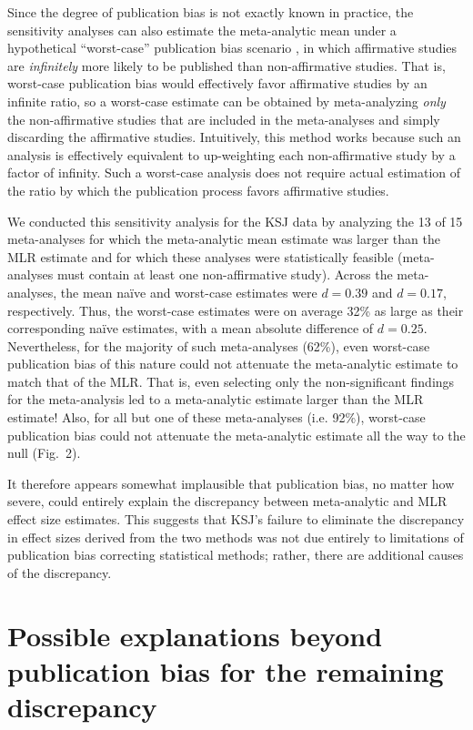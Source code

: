 \documentclass[man,floatsintext]{apa7}
\begin{document}
Since the degree of publication bias is not exactly known in practice, the sensitivity analyses can also estimate the meta-analytic mean under a hypothetical “worst-case” publication bias scenario \parencite{mathur2019sensitivity}, in which affirmative studies are \emph{infinitely} more likely to be published than non-affirmative studies.  That is, worst-case publication bias would effectively favor affirmative studies by an infinite ratio, so a worst-case estimate can be obtained by meta-analyzing \emph{only} the non-affirmative studies that are included in the meta-analyses and simply discarding the affirmative studies. Intuitively, this method works because such an analysis is effectively equivalent to up-weighting each non-affirmative study by a factor of infinity. Such a worst-case analysis does not require actual estimation of the ratio by which the publication process favors affirmative studies.
 

We conducted this sensitivity analysis for the KSJ data by analyzing the 13 of 15 meta-analyses for which the meta-analytic mean estimate was larger than the MLR estimate and for which these analyses were statistically feasible (meta-analyses must contain at least one non-affirmative study). Across the meta-analyses, the mean na{\"i}ve and worst-case estimates were $d=0.39$ and $d=0.17$, respectively. Thus, the worst-case estimates were on average 32\% as large as their corresponding na{\"i}ve estimates, with a mean absolute difference of $d=0.25$. Nevertheless, for the majority of such meta-analyses (62\%), even worst-case publication bias of this nature could not attenuate the meta-analytic estimate to match that of the MLR. That is, even selecting only the non-significant findings for the meta-analysis led to a meta-analytic estimate larger than the MLR estimate! Also, for all but one of these meta-analyses (i.e. 92\%), worst-case publication bias could not attenuate the meta-analytic estimate all the way to the null (Fig.\ 2).



It therefore appears somewhat implausible that publication bias, no matter how severe, could entirely explain the discrepancy between meta-analytic and MLR effect size estimates. This suggests that KSJ's failure to eliminate the discrepancy in effect sizes derived from the two methods was not due entirely to limitations of publication bias correcting statistical methods; rather, there are additional causes of the discrepancy.  

\section{Possible explanations beyond publication bias for the remaining discrepancy}
\end{document}
